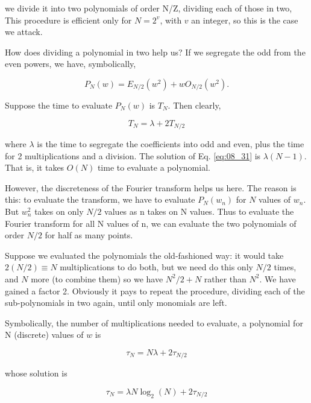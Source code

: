 we divide it into two polynomials of order N/Z, dividing each of those in two, \etc This procedure is efficient only for $N=2^v$, with $v$ an integer, so this is the case we attack.

How does dividing a polynomial in two help us? If we segregate the odd from the even powers, we have, symbolically,

\begin{equation}
P_{N}(w) = E_{N/2}(w^{2}) + w O_{N/2}(w^2).
\end{equation}

Suppose the time to evaluate $P_N(w)$ is $T_{N}$. Then clearly,

\begin{equation}\label{eq:08_31}
T_{N} = \lambda + 2T_{N/2}
\end{equation}

where $\lambda$ is the time to segregate the coefficients into odd and even, plus the time for 2 multiplications and a division. The solution of Eq. \ref{eq:08_31} is $\lambda(N-1)$. That is, it takes $O(N)$ time to evaluate a polynomial.

However, the discreteness of the Fourier transform helps us here. The reason is this: to evaluate the transform, we have to evaluate $P_{N}(w_{n})$ for $N$ values of $w_{n}$. But $w_{n}^{2}$ takes on only $N/2$ values as n takes on N values. Thus to evaluate the Fourier transform for all N values of n, we can evaluate the two polynomials of order $N/2$ for half as many points.

Suppose we evaluated the polynomials the old-fashioned way: it would take $2(N/2)\equiv N$ multiplications to do both, but we need do this only $N/2$ times, and $N$ more (to combine them) so we have $N^{2}/2+N$ rather than $N^{2}$. We have gained a factor 2. Obviously it pays to repeat the procedure, dividing each of the sub-polynomials in two again, until only monomials are left.

Symbolically, the number of multiplications needed to evaluate, a polynomial for N (discrete) values of $w$ is

\begin{equation}
\tau_{N} = N\lambda + 2\tau_{N/2}
\end{equation}

whose solution is

\begin{equation}
\tau_{N} = \lambda N \log_{2}(N) + 2\tau_{N/2}
\end{equation}

